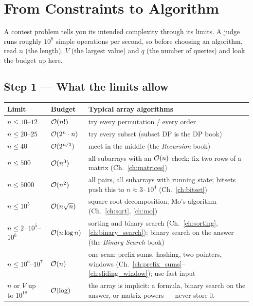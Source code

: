 \chapter{From Constraints to Algorithm}
\label{ch:constraints}

A contest problem tells you its intended complexity through its limits. A judge runs roughly $10^8$ simple operations per second, so before choosing an algorithm, read $n$ (the length), $V$ (the largest value) and $q$ (the number of queries) and look the budget up here.

\section*{Step 1 --- What the limits allow}

\begingroup\small\renewcommand{\arraystretch}{1.3}
\begin{tabularx}{\linewidth}{@{}l l X@{}}
\toprule
\textbf{Limit} & \textbf{Budget} & \textbf{Typical array algorithms} \\
\midrule
$n \le 10$--$12$ & $\mathcal{O}(n!)$ & try every permutation / every order \\
$n \le 20$--$25$ & $\mathcal{O}(2^n \cdot n)$ & try every subset (subset DP is the DP book) \\
$n \le 40$ & $\mathcal{O}(2^{n/2})$ & meet in the middle (the \textit{Recursion} book) \\
$n \le 500$ & $\mathcal{O}(n^3)$ & all subarrays with an $\mathcal{O}(n)$ check; fix two rows of a matrix (Ch.~\ref{ch:matrices}) \\
$n \le 5000$ & $\mathcal{O}(n^2)$ & all pairs, all subarrays with running state; bitsets push this to $n\approx 3\cdot10^4$ (Ch.~\ref{ch:bitset}) \\
$n \le 10^5$ & $\mathcal{O}(n\sqrt n)$ & square root decomposition, Mo's algorithm (Ch.~\ref{ch:sqrt}, \ref{ch:mo}) \\
$n \le 2\cdot10^5$--$10^6$ & $\mathcal{O}(n \log n)$ & sorting and binary search (Ch.~\ref{ch:sorting}, \ref{ch:binary_search}); binary search on the answer (the \textit{Binary Search} book) \\
$n \le 10^6$--$10^7$ & $\mathcal{O}(n)$ & one scan: prefix sums, hashing, two pointers, windows (Ch.~\ref{ch:prefix_sums}--\ref{ch:sliding_window}); use fast input \\
$n$ or $V$ up to $10^{18}$ & $\mathcal{O}(\log)$ & the array is implicit: a formula, binary search on the answer, or matrix powers --- never store it \\
\bottomrule
\end{tabularx}
\endgroup

